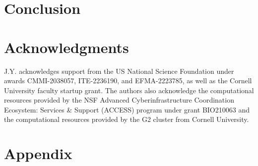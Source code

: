 \documentclass{article}
\begin{document}
\section{Conclusion}


\section*{Acknowledgments}
J.Y. acknowledges support from the US National Science Foundation under awards CMMI-2038057, ITE-2236190, and EFMA-2223785, as well as the Cornell University faculty startup grant. The authors also acknowledge the computational resources provided by the NSF Advanced Cyberinfrastructure Coordination Ecosystem: Services \& Support (ACCESS) program under grant BIO210063 and the computational resources provided by the G2 cluster from Cornell University.


 
\newpage

\section*{Appendix}

\end{document}

